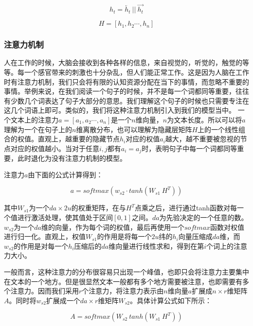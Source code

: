 \documentclass[UTF8,11pt,a4paper,nofonts]{ctexart}
\begin{document}
\begin{equation}
h_t = \overleftarrow{h_t} ~||~ \overrightarrow{h_t}
\end{equation} 

\begin{equation}
H =[h_1,h_2\cdots,h_n]
\end{equation}


\subsubsection{注意力机制}
人在工作的时候，大脑会接收到各种各样的信息，来自视觉的，听觉的，触觉的等等。每一个感官带来的刺激也十分杂乱，但人们能正常工作。这是因为人脑在工作时有注意力机制，我们只会将有限的认知资源分配在当下的事情，而忽略不重要的事情。举例来说，在我们阅读一个句子的时候，并不是每一个词都同等重要，往往有少数几个词表达了句子大部分的意思。我们理解这个句子的时候也只需要专注在这几个词语上即可。类似的，我们将这种注意力机制引入到我们的模型当中。
一个文本上的注意力$a = [a_1,a_2\cdots,a_n]$是一个$n$维向量，$n$为文本长度。所以可以将$a$理解为一个在句子上的$n$维离散分布，也可以理解为隐藏层矩阵$H$上的一个线性组合的权值。直观上，越重要的隐藏节点$h_i$对应的权值$a_i$越大，越不重要被忽视的节点对应的权值越小。当对于任意$i,j$都有$a_i = a_j$时，表明句子中每一个词都同等重要，此时退化为没有注意力机制的模型。

注意力$a$由下面的公式计算得到：

\begin{equation}
 a = softmax(w_{s2} \cdot tanh(W_{s1}~ H^T))
\end{equation}


其中$W_{s1}$为一个$da \times 2u$的权重矩阵，在与$H^T$点乘之后，进行通过tanh函数对每一个值进行激活处理，使其值处于区间$[0,1]$之间。$da$为先验决定的一个任意的数。$w_{s2}$为一个$da$维的向量，作为每个词的权值，最后再使用一个$softmax$函数对权值进行归一化。直观上，权值$W_{s1}$的作用是将每一个$2u$纬的$h_i$向量压缩成$da$维，而$w_{s2}$的作用是对每一个$h_i$压缩后的$da$维向量进行线性求和，得到在第$i$个词上的注意力大小。

一般而言，这种注意力的分布很容易只出现一个峰值，也即只会将注意力主要集中在文本的一个地方。但是很显然文本一般都有多个地方需要被注意，也即需要有多个注意力。因而我们采用$r$个注意力，将注意力表示由$n$维向量$a$扩展成$n\times r$维矩阵$A$。同时将$w_{s2}$扩展成一个$da\times r$维矩阵$W_{s2}$。具体计算公式如下所示：

\begin{equation}
 A = softmax(W_{s2} ~ tanh(W_{s1}~ H^T))
\end{equation}
\end{document}
